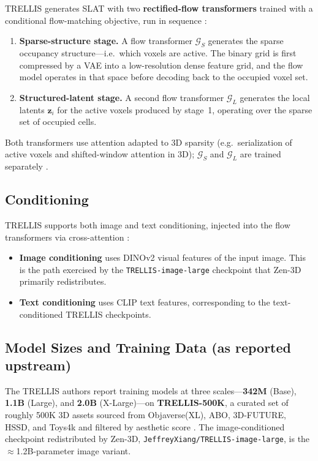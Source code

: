 \documentclass[11pt,a4paper]{article}
\begin{document}
TRELLIS generates SLAT with two \textbf{rectified-flow transformers} trained with a conditional
flow-matching objective, run in sequence \cite{xiang2024trellis}:

\begin{enumerate}
    \item \textbf{Sparse-structure stage.} A flow transformer $\mathcal{G}_S$ generates the
    sparse occupancy structure---i.e.\ which voxels are active. The binary grid is first
    compressed by a VAE into a low-resolution dense feature grid, and the flow model operates in
    that space before decoding back to the occupied voxel set.
    \item \textbf{Structured-latent stage.} A second flow transformer $\mathcal{G}_L$ generates
    the local latents $\boldsymbol{z}_i$ for the active voxels produced by stage~1, operating
    over the sparse set of occupied cells.
\end{enumerate}

Both transformers use attention adapted to 3D sparsity (e.g.\ serialization of active voxels and
shifted-window attention in 3D); $\mathcal{G}_S$ and $\mathcal{G}_L$ are trained separately
\cite{xiang2024trellis}.

\subsection{Conditioning}

TRELLIS supports both image and text conditioning, injected into the flow transformers via
cross-attention \cite{xiang2024trellis}:

\begin{itemize}
    \item \textbf{Image conditioning} uses DINOv2 visual features of the input image. This is
    the path exercised by the \texttt{TRELLIS-image-large} checkpoint that Zen-3D primarily
    redistributes.
    \item \textbf{Text conditioning} uses CLIP text features, corresponding to the
    text-conditioned TRELLIS checkpoints.
\end{itemize}

\subsection{Model Sizes and Training Data (as reported upstream)}

The TRELLIS authors report training models at three scales---\textbf{342M} (Base), \textbf{1.1B}
(Large), and \textbf{2.0B} (X-Large)---on \textbf{TRELLIS-500K}, a curated set of roughly 500K
3D assets sourced from Objaverse(XL), ABO, 3D-FUTURE, HSSD, and Toys4k and filtered by aesthetic
score \cite{xiang2024trellis,trellis_repo}. The image-conditioned checkpoint redistributed by
Zen-3D, \texttt{JeffreyXiang/TRELLIS-image-large}, is the $\approx$1.2B-parameter image variant.
\end{document}
